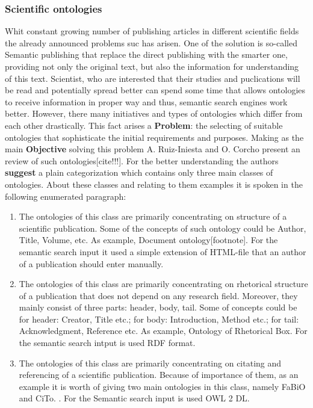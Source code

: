 		\subsubsection{Scientific ontologies}
		Whit constant growing number of publishing articles in different scientific fields the already announced problems suc has arisen. One of the solution is so-called Semantic publishing that replace the direct publishing with the smarter one, providing not only the original text, but also the information for understanding of this text. Scientist, who are interested that their studies and puclications will be read and potentially spread better can spend some time that allows ontologies to receive information in proper way and thus, semantic search engines work better. However, there many initiatives and types of ontologies which differ from each other drastically. This fact arises a \textbf{Problem}: the selecting of suitable ontologies that sophisticate the initial requirements and purposes. Making as the main \textbf{Objective} solving this problem A. Ruiz-Iniesta and O. Corcho present an review of such ontologies[cite!!!].
		For the better understanding the authors \textbf{suggest} a plain categorization which contains only three main classes of ontologies. About these classes and relating to them examples it is spoken in the following enumerated paragraph:
			\begin{enumerate}
				\item {}\frqq The ontologies of this class are primarily concentrating on structure of a scientific publication. Some of the concepts of such ontology could be Author, Title, Volume, etc. As example, Document ontology[footnote]. For the semantic search input it used a simple extension of HTML-file that an author of a publication should enter manually.
				\item {}\frqq The ontologies of this class are primarily concentrating on rhetorical structure of a publication that does not depend on any research field. Moreover, they mainly consist of three parts: header, body, tail. Some of concepts could be for header: Creator, Title etc.; for body: Introduction, Method etc.; for tail: Acknowledgment, Reference etc. As example, Ontology of Rhetorical Box. For the semantic search intput is used RDF format.  
				\item {}\frqq  The ontologies of this class are primarily concentrating on citating and referencing of a scientific publication. Because of importance of them, as an example it is worth of giving two main ontologies in this class, namely FaBiO and CiTo. \frqq[cite]. For the Semantic search input is used OWL 2 DL. 
			\end{enumerate}
